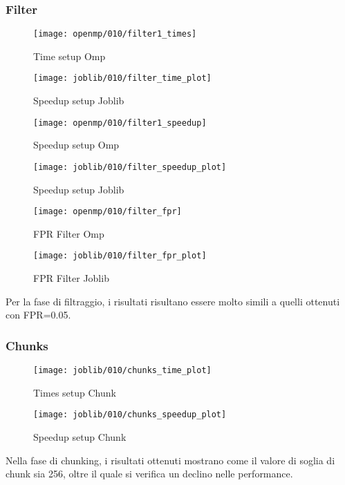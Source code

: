 \subsubsection{Filter}\label{subsubsec:fpr-010-filter}
\begin{figure}[H]
    \centering
    \texttt{[image: openmp/010/filter1\_times]}
        \caption{Time setup Omp}\label{fig:010-filter_time_omp}
    \endminipage\hfill
    \texttt{[image: joblib/010/filter\_time\_plot]}
        \caption{Speedup setup Joblib}\label{fig:010-filter_time_joblib}
    \endminipage\hfill
\end{figure}
\begin{figure}[H]
    \centering
    \texttt{[image: openmp/010/filter1\_speedup]}
        \caption{Speedup setup Omp}\label{fig:010-filter_speedup_omp}
    \endminipage\hfill
    \texttt{[image: joblib/010/filter\_speedup\_plot]}
        \caption{Speedup setup Joblib}\label{fig:010-filter_speedup_joblib}
    \endminipage\hfill
\end{figure}
\begin{figure}[H]
    \centering
    \texttt{[image: openmp/010/filter\_fpr]}
        \caption{FPR Filter Omp}\label{fig:010-filter_fpr_omp}
    \endminipage\hfill
    \texttt{[image: joblib/010/filter\_fpr\_plot]}
        \caption{FPR Filter Joblib}\label{fig:010-filter_fpr_joblib}
    \endminipage\hfill
\end{figure}

Per la fase di filtraggio, i risultati risultano essere molto simili a quelli ottenuti con FPR=0.05.

\subsubsection{Chunks}\label{subsubsec:010-chunks}
\begin{figure}[H]
    \centering
    \texttt{[image: joblib/010/chunks\_time\_plot]}
        \caption{Times setup Chunk}\label{fig:010-chunks_time}
    \endminipage\hfill
    \texttt{[image: joblib/010/chunks\_speedup\_plot]}
        \caption{Speedup setup Chunk}\label{fig:010-chunks_speedup}
    \endminipage\hfill
\end{figure}

Nella fase di chunking, i risultati ottenuti mostrano come il valore di soglia di chunk sia 256, oltre il quale si
verifica un declino nelle performance.